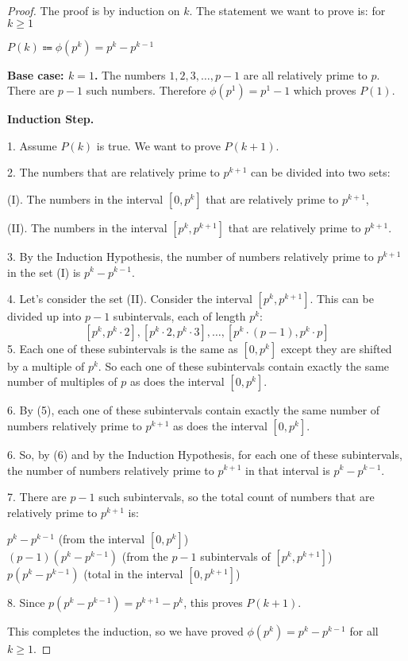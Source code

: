 \documentclass[14pt]{extarticle}
\begin{document}
\begin{proof}
The proof is by induction on $k$. The statement we want to prove is: for $k \geq 1$
\begin{center}
$P(k) \Coloneqq \phi(p^k) = p^k - p^{k - 1}$
\end{center}
{\bf Base case: $k = 1$.} The numbers $1, 2, 3, \ldots, p-1$ are all relatively prime to $p$. There are $p-1$ such numbers. Therefore $\phi(p^1) = p^1 - 1$ which proves $P(1)$.

{\bf Induction Step.} 

1. Assume $P(k)$ is true. We want to prove $P(k+1)$.

2. The numbers that are relatively prime to $p^{k+1}$ can be divided into two sets:

(I). The numbers in the interval $[0, p^k]$ that are relatively prime to $p^{k+1}$,

(II). The numbers in the interval $[p^k, p^{k+1}]$ that are relatively prime to $p^{k+1}$.

3. By the Induction Hypothesis, the number of numbers relatively prime to $p^{k+1}$ in the set (I) is $p^k - p^{k-1}$.

4. Let's consider the set (II). Consider the interval $[p^k, p^{k+1}]$. This can be divided up into $p-1$ subintervals, each of length $p^k$:
$$
[p^k, p^k \cdot 2], [p^k \cdot 2, p^k \cdot 3], \ldots, [p^k \cdot (p-1), p^k \cdot p]
$$
5. Each one of these subintervals is the same as $[0, p^k]$ except they are shifted by a multiple of $p^k$. So each one of these subintervals contain exactly the same number of multiples of $p$ as does the interval $[0, p^k]$. 

6. By (5), each one of these subintervals contain exactly the same number of numbers relatively prime to $p^{k+1}$ as does the interval $[0, p^k]$. 

6. So, by (6) and by the Induction Hypothesis, for each one of these subintervals, the number of numbers relatively prime to $p^{k+1}$ in that interval is $p^k - p^{k-1}$.

7. There are $p-1$ such subintervals, so the total count of numbers that are relatively prime to $p^{k+1}$ is:
\begin{center}
$p^k - p^{k-1}$ (from the interval $[0, p^k]$)\\
$(p-1)(p^k - p^{k-1})$ (from the $p-1$ subintervals of $[p^k, p^{k+1}]$)\\
$p(p^k - p^{k-1})$ (total in the interval $[0, p^{k+1}]$)
\end{center}

8. Since $p(p^k - p^{k-1}) = p^{k+1} - p^k$, this proves $P(k+1)$. 

This completes the induction, so we have proved $\phi(p^k) = p^k - p^{k - 1}$ for all $k \geq 1$.
\end{proof}
\end{document}
